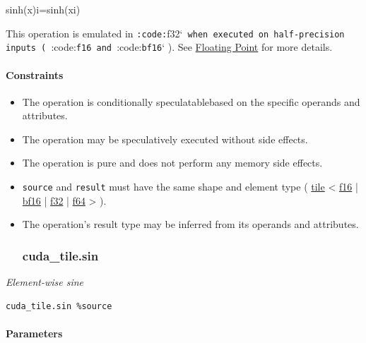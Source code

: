 \documentclass{article}
\begin{document}
sinh(x)i=sinh(xi)

This operation is emulated in \texttt{:code:}f32`\texttt{ when executed on half-precision inputs ( }:code:\texttt{f16}\texttt{ and }:code:\texttt{bf16}` ). See \href{https://docs.nvidia.com/cuda/tile-ir/latest/sections/operations.html#op-group-floating-point}{Floating Point} for more details.



\paragraph{Constraints}

\begin{itemize}
\item The operation is conditionally speculatablebased on the specific operands and attributes.
\item The operation may be speculatively executed without side effects.
\item The operation is pure and does not perform any memory side effects.
\item \texttt{source} and \texttt{result} must have the same shape and element type ( \href{https://docs.nvidia.com/cuda/tile-ir/latest/sections/types.html#type-tile}{tile} < \href{https://docs.nvidia.com/cuda/tile-ir/latest/sections/types.html#subsection-element-types}{f16} | \href{https://docs.nvidia.com/cuda/tile-ir/latest/sections/types.html#subsection-element-types}{bf16} | \href{https://docs.nvidia.com/cuda/tile-ir/latest/sections/types.html#subsection-element-types}{f32} | \href{https://docs.nvidia.com/cuda/tile-ir/latest/sections/types.html#subsection-element-types}{f64} > ).
\item The operation's result type may be inferred from its operands and attributes.


\subsubsection{cuda\_tile.sin}

\end{itemize}
\textit{Element-wise sine}


\begin{lstlisting}
cuda_tile.sin %source
\end{lstlisting}

\paragraph{Parameters}
\end{document}

